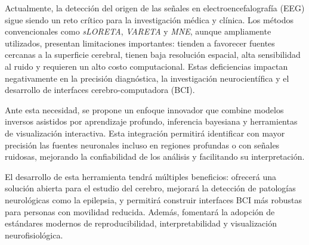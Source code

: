 Actualmente, la detección del origen de las señales en electroencefalografía (EEG) sigue siendo un reto crítico para la investigación médica y clínica. Los métodos convencionales como \textit{sLORETA}, \textit{VARETA} y \textit{MNE}, aunque ampliamente utilizados, presentan limitaciones importantes: tienden a favorecer fuentes cercanas a la superficie cerebral, tienen baja resolución espacial, alta sensibilidad al ruido y requieren un alto costo computacional. Estas deficiencias impactan negativamente en la precisión diagnóstica, la investigación neurocientífica y el desarrollo de interfaces cerebro-computadora (BCI).

Ante esta necesidad, se propone un enfoque innovador que combine modelos inversos asistidos por aprendizaje profundo, inferencia bayesiana y herramientas de visualización interactiva. Esta integración permitirá identificar con mayor precisión las fuentes neuronales incluso en regiones profundas o con señales ruidosas, mejorando la confiabilidad de los análisis y facilitando su interpretación.

El desarrollo de esta herramienta tendrá múltiples beneficios: ofrecerá una solución abierta para el estudio del cerebro, mejorará la detección de patologías neurológicas como la epilepsia, y permitirá construir interfaces BCI más robustas para personas con movilidad reducida. Además, fomentará la adopción de estándares modernos de reproducibilidad, interpretabilidad y visualización neurofisiológica.
